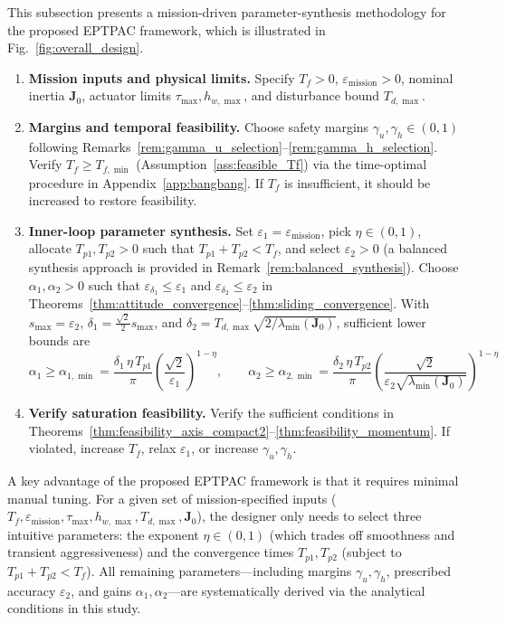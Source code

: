 \documentclass[journal]{new-aiaa}
\begin{document}
This subsection presents a mission-driven parameter-synthesis methodology for the proposed EPTPAC framework, which is illustrated in Fig.~\ref{fig:overall_design}.

\begin{enumerate}
\item \textbf{Mission inputs and physical limits.}
Specify $T_f>0$, $\varepsilon_{\mathrm{mission}}>0$, nominal inertia $\boldsymbol{J}_0$, actuator limits $\tau_{\max},h_{w,\max}$, and disturbance bound $T_{d,\max}$.

\item \textbf{Margins and temporal feasibility.}
Choose safety margins $\gamma_u,\gamma_h\in(0,1)$ following Remarks~\ref{rem:gamma_u_selection}--\ref{rem:gamma_h_selection}.
Verify $T_f\ge T_{f,\min}$ (Assumption~\ref{ass:feasible_Tf}) via the time-optimal procedure in Appendix~\ref{app:bangbang}.
If $T_f$ is insufficient, it should be increased to restore feasibility.

\item \textbf{Inner-loop parameter synthesis.}
Set $\varepsilon_1 = \varepsilon_{\mathrm{mission}}$, pick $\eta\in(0,1)$, allocate $T_{p1},T_{p2}>0$ such that $T_{p1}+T_{p2}<T_f$, 
and select $\varepsilon_2>0$ (a balanced synthesis approach is provided in Remark~\ref{rem:balanced_synthesis}).
Choose $\alpha_1,\alpha_2>0$ such that $\varepsilon_{\delta_1}\le\varepsilon_1$ and $\varepsilon_{\delta_2}\le\varepsilon_2$ in Theorems~\ref{thm:attitude_convergence}--\ref{thm:sliding_convergence}.
With $s_{\max}=\varepsilon_2$, $\delta_1 = \frac{\sqrt{2}}{2} s_{\max}$, and $\delta_2=T_{d,\max}\sqrt{2/\lambda_{\min}(\boldsymbol{J}_0)}$, sufficient lower bounds are
\begin{equation}
\alpha_1 \ge \alpha_{1,\min} = \frac{\delta_1\,\eta\,T_{p1}}{\pi}\left(\frac{\sqrt{2}}{\varepsilon_1}\right)^{1-\eta},\qquad
\alpha_2 \ge \alpha_{2,\min} = \frac{\delta_2\,\eta\,T_{p2}}{\pi}\left(\frac{\sqrt{2}}{\varepsilon_2 \sqrt{\lambda_{\min}(\boldsymbol{J}_0)}}\right)^{1-\eta}
\label{eq:alpha_min_short}
\end{equation}

\item \textbf{Verify saturation feasibility.}
Verify the sufficient conditions in Theorems~\ref{thm:feasibility_axis_compact2}--\ref{thm:feasibility_momentum}.
If violated, increase $T_f$, relax $\varepsilon_1$,
or increase $\gamma_u,\gamma_h$.
\end{enumerate}

A key advantage of the proposed EPTPAC framework is that it requires minimal manual tuning. 
For a given set of mission-specified inputs 
($T_f,\varepsilon_{\mathrm{mission}},\tau_{\max},h_{w,\max},T_{d,\max},\boldsymbol{J}_0$), 
the designer only needs to select three intuitive parameters: 
the exponent $\eta\in(0,1)$ (which trades off smoothness and transient aggressiveness) 
and the convergence times $T_{p1},T_{p2}$ (subject to $T_{p1}+T_{p2}<T_f$).
All remaining parameters---including margins $\gamma_u,\gamma_h$, prescribed accuracy $\varepsilon_2$, and gains $\alpha_1,\alpha_2$---are systematically derived via the analytical conditions in this study.
\end{document}
